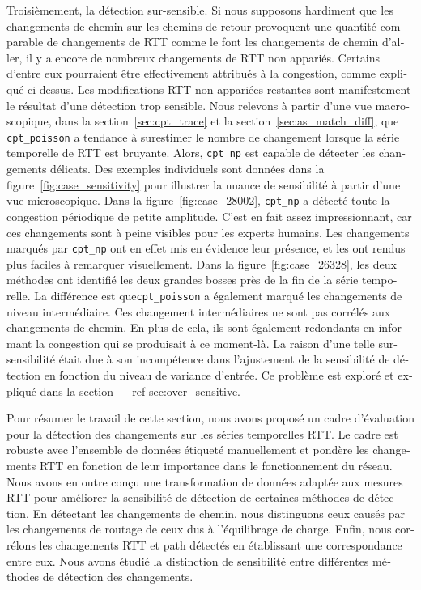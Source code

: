 \begin{otherlanguage}{french}
Troisièmement, la détection sur-sensible.
Si nous supposons hardiment que les changements de chemin sur les chemins de retour provoquent une quantité comparable de changements de RTT comme le font les changements de chemin d'aller, il y a encore de nombreux changements de RTT non appariés.
Certains d'entre eux pourraient être effectivement attribués à la congestion, comme expliqué ci-dessus.
Les modifications RTT non appariées restantes sont manifestement le résultat d'une détection trop sensible.
Nous relevons à partir d'une vue macroscopique, dans la section~\ref{sec:cpt_trace} et la section~\ref {sec:as_match_diff}, 
que \texttt{cpt\_poisson} a tendance à surestimer le nombre de changement lorsque la série temporelle de RTT est bruyante.
Alors, \texttt{cpt\_np} est capable de détecter les changements délicats.
Des exemples individuels sont données dans la figure~\ref{fig:case_sensitivity} pour illustrer 
la nuance de sensibilité à partir d'une vue microscopique.
Dans la figure~\ref{fig:case_28002}, \texttt{cpt\_np} a détecté toute la congestion périodique de petite amplitude.
C'est en fait assez impressionnant, car ces changements sont à peine visibles pour les experts humains.
Les changements marqués par \texttt{cpt\_np} ont en effet mis en évidence leur présence, et les ont rendus plus faciles à remarquer visuellement.
Dans la figure~\ref{fig:case_26328}, les deux méthodes ont identifié les deux grandes bosses près de la fin de la série temporelle.
La différence est que\texttt{cpt\_poisson} a également marqué les changements de niveau intermédiaire.
Ces changement intermédiaires ne sont pas corrélés aux changements de chemin.
En plus de cela, ils sont également redondants en informant la congestion qui se produisait à ce moment-là.
La raison d'une telle sur-sensibilité était due à son incompétence dans l'ajustement de la sensibilité de détection en fonction du niveau de variance d'entrée. Ce problème est exploré et expliqué dans la section ~ \ ref {sec:over_sensitive}.

Pour résumer le travail de cette section, nous avons proposé un cadre d'évaluation pour la détection des changements sur les séries temporelles RTT.
Le cadre est robuste avec l'ensemble de données étiqueté manuellement et pondère les changements RTT en fonction de leur importance dans le fonctionnement du réseau.
Nous avons en outre conçu une transformation de données adaptée aux mesures RTT pour améliorer la sensibilité de détection de certaines méthodes de détection.
En détectant les changements de chemin, nous distinguons ceux causés par les changements de routage de ceux dus à l'équilibrage de charge.
Enfin, nous corrélons les changements RTT et path détectés en établissant une correspondance entre eux.
Nous avons étudié la distinction de sensibilité entre différentes méthodes de détection des changements.


\end{otherlanguage}
